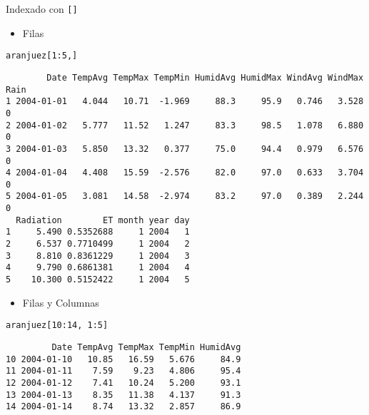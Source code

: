 \documentclass[xcolor={usenames,svgnames,dvipsnames}]{beamer}
\begin{document}
\begin{frame}[label={sec:org6af0893},fragile]{Indexado con \texttt{[]}}
 \begin{itemize}
\item Filas
\end{itemize}
\lstset{language=r,label= ,caption= ,captionpos=b,numbers=none}
\begin{lstlisting}
aranjuez[1:5,]
\end{lstlisting}

\begin{verbatim}
        Date TempAvg TempMax TempMin HumidAvg HumidMax WindAvg WindMax Rain
1 2004-01-01   4.044   10.71  -1.969     88.3     95.9   0.746   3.528    0
2 2004-01-02   5.777   11.52   1.247     83.3     98.5   1.078   6.880    0
3 2004-01-03   5.850   13.32   0.377     75.0     94.4   0.979   6.576    0
4 2004-01-04   4.408   15.59  -2.576     82.0     97.0   0.633   3.704    0
5 2004-01-05   3.081   14.58  -2.974     83.2     97.0   0.389   2.244    0
  Radiation        ET month year day
1     5.490 0.5352688     1 2004   1
2     6.537 0.7710499     1 2004   2
3     8.810 0.8361229     1 2004   3
4     9.790 0.6861381     1 2004   4
5    10.300 0.5152422     1 2004   5
\end{verbatim}

\begin{itemize}
\item Filas y Columnas
\end{itemize}
\lstset{language=r,label= ,caption= ,captionpos=b,numbers=none}
\begin{lstlisting}
aranjuez[10:14, 1:5]
\end{lstlisting}

\begin{verbatim}
         Date TempAvg TempMax TempMin HumidAvg
10 2004-01-10   10.85   16.59   5.676     84.9
11 2004-01-11    7.59    9.23   4.806     95.4
12 2004-01-12    7.41   10.24   5.200     93.1
13 2004-01-13    8.35   11.38   4.137     91.3
14 2004-01-14    8.74   13.32   2.857     86.9
\end{verbatim}
\end{frame}
\end{document}
